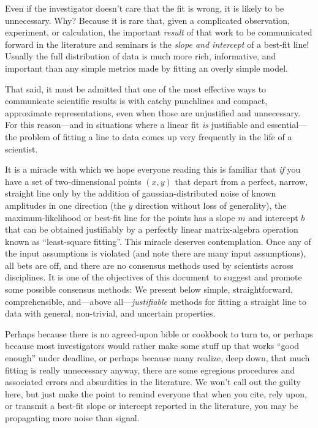\documentclass[12pt,twoside]{article}
\newcommand{\documentname}{document}
\newcounter{problem}
\begin{document}
Even if the investigator doesn't care that the fit is wrong, it is
likely to be unnecessary.  Why?  Because it is rare that, given a
complicated observation, experiment, or calculation, the important
\emph{result} of that work to be communicated forward in the
literature and seminars is the \emph{slope and intercept} of a
best-fit line!  Usually the full distribution of data is much more
rich, informative, and important than any simple metrics made by
fitting an overly simple model.

That said, it must be admitted that one of the most effective ways to
communicate scientific results is with catchy punchlines and compact,
approximate representations, even when those are unjustified and
unnecessary.  For this reason---and in situations where a linear fit
\emph{is} justifiable and essential---the problem of fitting a line to
data comes up very frequently in the life of a scientist.

It is a miracle with which we hope everyone reading this is familiar
that \emph{if} you have a set of two-dimensional points $(x,y)$ that
depart from a perfect, narrow, straight line only by the addition of
gaussian-distributed noise of known amplitudes in one direction (the
$y$ direction without loss of generality), the maximum-likelihood or
best-fit line for the points has a slope $m$ and intercept $b$ that
can be obtained justifiably by a perfectly linear matrix-algebra
operation known as ``least-square fitting''.  This miracle deserves
contemplation.  Once any of the input assumptions is violated (and
note there are many input assumptions), all bets are off, and there
are no consensus methods used by scientists across disciplines.  It is
one of the objectives of this \documentname\ to suggest and promote some
possible consensus methods: We present below simple, straightforward,
comprehensible, and---above all---\emph{justifiable} methods for
fitting a straight line to data with general, non-trivial, and
uncertain properties.

Perhaps because there is no agreed-upon bible or cookbook to turn to,
or perhaps because most investigators would rather make some stuff up
that works ``good enough'' under deadline, or perhaps because many
realize, deep down, that much fitting is really unnecessary anyway,
there are some egregious procedures and associated errors and
absurdities in the literature.  We won't call out the guilty here, but
just make the point to remind everyone that when you cite, rely upon,
or transmit a best-fit slope or intercept reported in the literature,
you may be propagating more noise than signal.
\end{document}
